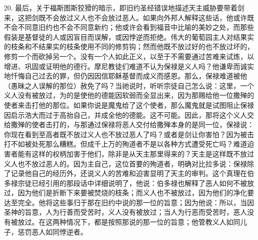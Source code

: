 20. 最后，关于福斯图斯狡猾的暗示，即旧约圣经错误地描述天主威胁要带着剑来，这把剑既不会放过义人也不会放过恶人。如果向外邦人解释这些话，他或许既不会不同意旧约也不会不同意新约；他或许会看到福音中比喻的美妙之处，而那些假装是基督徒的人或因盲目而误解，或因悖逆而拒绝。伟大的葡萄园主人对结果实的枝条和不结果实的枝条使用不同的修剪钩；然而他既不放过好的也不放过坏的，修剪一个而砍掉另一个。没有一个人如此正义，以至于不需要通过苦难来试炼，以增进、巩固或证明他的德行。摩尼教徒们难道不认为保禄是义人吗？他谦卑而诚实地忏悔自己过去的罪，但仍因因信耶稣基督而成义而感恩。那么，保禄难道被他（愚昧之人误解的那位）赦免了吗？当祂说时，听听宗徒自己怎么说：这里，一个义人没有被放过，为的是使他的德能因软弱而全显出来，因为那赐给他一位撒殚的使者来击打他的那位。如果你说是魔鬼给了这个使者，那么魔鬼就是试图阻止保禄因启示浩大而过于高抬自己，并成全他的德能。这不可能。因此，那将这个义人交给撒殚的使者击打的，与那通过保禄将恶人交付给撒殚本身的是同一位，保禄说：你现在看到至高者既不放过义人也不放过恶人了吗？或者是剑让你害怕？因为被击打不如被处死那么糟糕。但成千上万的殉道者不是以各种方式遭受死亡吗？难道迫害者能有这样的权柄加害于他们，除非是从天主那里得来的？天主是这样既不放过义人也不放过恶人的。因为主自己，这位首要的殉道者，明确对比拉多说：保禄除了记录他自己的经历外，还说义人的苦难和迫害显明了天主的审判。这个真理在伯多禄宗徒已经引用的那段话中详细说明了，他说：伯多禄也解释了恶人如何不被放过，因为他们是折断下来要被焚烧的枝条；而义人也不被放过，因为他们的净化要达至完全。他将这些事归于那在旧约中说的那一位的旨意；因为他说：所以，当因圣神的旨意，人为行善而受苦时，义人没有被放过；当人为行恶而受苦时，恶人没有被放过。在这两种情况下，都是按照那说的那一位的旨意；他管教义人如同儿子，惩罚恶人如同悖逆者。\par

